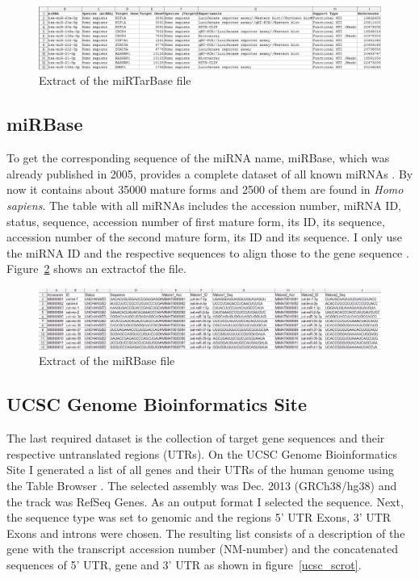 \documentclass[11pt, a4paper, oneside]{book}
\begin{document}
\begin{figure}[h]
\centering
\includegraphics[width=\textwidth]{results/mirtarbase_scrot.png}
\caption{Extract of the miRTarBase file}
\label{mirtarbase_scrot}
\end{figure}
\vspace{0.5cm}


\subsection{miRBase}
To get the corresponding sequence of the miRNA name, miRBase, which was already published in 2005, provides a complete dataset of all known miRNAs \cite{Griffiths-Jones}. By now it contains about 35000 mature forms and 2500 of them are found in \textit{Homo sapiens}. The table with all miRNAs includes the accession number, miRNA ID, status, sequence, accession number of first mature form, its ID, its sequence, accession number of the second mature form, its ID and its sequence. I only use the miRNA ID and the respective sequences to align those to the gene sequence \cite{mirbase}. Figure~\ref{mirbase_scrot} shows an extractof the file.\\


\begin{figure}[h]
\centering
\includegraphics[width=\textwidth]{results/mirbase.png}
\caption{Extract of the miRBase file}
\label{mirbase_scrot}
\end{figure}


\vspace{0.5cm}

 
\subsection{UCSC Genome Bioinformatics Site}
The last required dataset is the collection of target gene sequences and their respective untranslated regions (UTRs). On the UCSC Genome Bioinformatics Site I generated a list of all genes and their UTRs of the human genome using the Table Browser \cite{ucsc}. The selected assembly was Dec. 2013 (GRCh38/hg38) and the track was RefSeq Genes. As an output format I selected the sequence. Next, the sequence type was set to genomic and the regions 5' UTR Exons, 3' UTR Exons and introns were chosen. The resulting list consists of a description of the gene with the transcript accession number (NM-number) and the concatenated sequences of 5' UTR, gene and 3' UTR as shown in figure~\ref{ucsc_scrot}.\\
\end{document}
